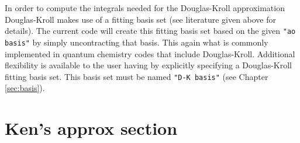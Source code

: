In order to compute the integrals needed for the Douglas-Kroll approximation 
Douglas-Kroll makes use of a fitting basis set (see literature given above 
for details). The current code will create this fitting basis set based on 
the given {\tt "ao basis"} by simply uncontracting that basis. This again what is 
commonly implemented in quantum chemistry codes that include Douglas-Kroll.
Additional flexibility is available to the user having by explicitly specifying
a Douglas-Kroll fitting basis set. This basis set must be named {\tt "D-K basis"}
(see Chapter \ref{sec:basis}).

\section{Ken's approx section}
\label{sec:ken's approx section}

